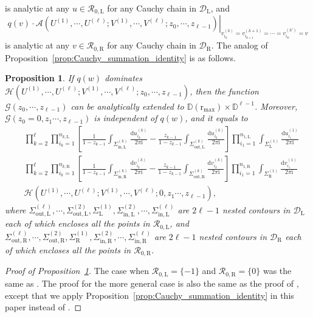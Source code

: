 \documentclass{article}
\newtheorem{prop}[thm]{Proposition}
\numberwithin{equation}{section}
\newcommand{\ddbar}[2]{\frac{{\mathrm d}#1}{2\pi {\mathrm i}#2}}
\newcommand{\inn}{\mathrm{in}}
\newcommand{\LL}{\mathrm{L}}
\newcommand{\out}{\mathrm{out}}
\newcommand{\RR}{\mathrm{R}}
\newcommand{\rr}{\mathrm{r_{max}}}
\begin{document}
is analytic at any $u\in \mathcal{R}_{0,\LL}$ for any Cauchy chain in $\mathcal{D}_\LL$, and
\begin{equation*}
	\left.q(v)\cdot \mathcal{A}\left(U^{(1)},\cdots,U^{(\ell)};V^{(1)},\cdots,V^{(\ell)};z_0,\cdots,z_{\ell-1}\right)\right|_{v_{i_k}^{(k)}=v_{i_{k+1}}^{(k+1)}=\cdots=v_{i_{k'}}^{(k')}=v}
\end{equation*}
is analytic at any $v\in \mathcal{R}_{0,\RR}$ for any Cauchy chain in $\mathcal{D}_\RR$. The analog of Proposition~\ref{prop:Cauchy_summation_identity} is as follows.
\begin{prop}
	\label{prop:Cauchy_summation_identity2}
	If $q(w)$ dominates $\mathcal{H}\left(U^{(1)},\cdots,U^{(\ell)};V^{(1)},\cdots,V^{(\ell)};z_0,\cdots,z_{\ell-1}\right)$, then the function $\mathcal{G}(z_0,\cdots,z_{\ell-1})$ can be analytically extended to $\mathbb{D}(\rr)\times\mathbb{D}^{\ell-1}$. Moreover, $\mathcal{G}(z_0=0,z_1\cdots,z_{\ell-1})$ is independent of $q(w)$, and it equals to
	\begin{equation*}
		\begin{split}
		&\prod_{k=2}^{\ell}\prod_{i_k=1}^{n_{k,\LL}} \left[\frac{1}{1-z_{k-1}} \int_{\Sigma_{\inn,\LL}^{(k)}}\ddbar{u_{i_k}^{(k)}}{} -\frac{z_{k-1}}{1-z_{k-1}}\int_{\Sigma^{(k)}_{\out,\LL}}\ddbar{u_{i_k}^{(k)}}{}\right]\prod_{i_1=1}^{n_{1,\LL}} \int_{\Sigma^{(1)}_\LL}\ddbar{u_{i_1}^{(1)}}{}\\
		&\prod_{k=2}^{\ell}\prod_{i_k=1}^{n_{k,\RR}} \left[\frac{1}{1-z_{k-1}} \int_{\Sigma_{\inn,\RR}^{(k)}}\ddbar{v_{i_k}^{(k)}}{} -\frac{z_{k-1}}{1-z_{k-1}}\int_{\Sigma^{(k)}_{\out,\RR}}\ddbar{v_{i_k}^{(k)}}{}\right]\prod_{i_1=1}^{n_{1,\RR}} \int_{\Sigma^{(1)}_\RR}\ddbar{v_{i_1}^{(1)}}{}\\
		&\mathcal{H}\left(U^{(1)},\cdots,U^{(\ell)};V^{(1)},\cdots,V^{(\ell)};0,z_1\cdots,z_{\ell-1}\right),
		\end{split}
	\end{equation*}
where $\Sigma_{\out,\LL}^{(\ell)},\cdots,\Sigma_{\out,\LL}^{(2)},\Sigma^{(1)}_\LL,\Sigma_{\inn,\LL}^{(2)},\cdots,\Sigma_{\inn,\LL}^{(\ell)}$ are $2\ell-1$ nested contours in $\mathcal{D}_\LL$ each of which encloses all the points in $\mathcal{R}_{0,\LL}$, and $\Sigma_{\out,\RR}^{(\ell)},\cdots,\Sigma_{\out,\RR}^{(2)},\Sigma^{(1)}_\RR,\Sigma_{\inn,\RR}^{(2)},\cdots,\Sigma_{\inn,\RR}^{(\ell)}$ are $2\ell-1$ nested contours in $\mathcal{D}_\RR$ each of which encloses all the points in $\mathcal{R}_{0,\RR}$.
\end{prop}
\begin{proof}[Proof of Proposition~\ref{prop:Cauchy_summation_identity2}]
	The case when $\mathcal{R}_{0,\LL}=\{-1\}$ and $\mathcal{R}_{0,\RR}=\{0\}$ was the same as \cite[Proposition 4.4]{Liu19}. The proof for the more general case is also the same as the proof of \cite[Proposition 4.4]{Liu19}, except that we apply Proposition~\ref{prop:Cauchy_summation_identity} in this paper instead of \cite[Proposition 4.2]{Liu19}.
\end{proof}
\end{document}
